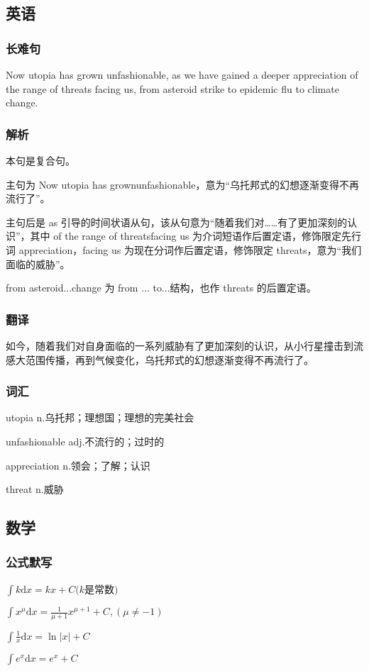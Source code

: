 \documentclass[UTF8]{ctexart}
\begin{document}
\subsection{英语}
\subsubsection{长难句}
Now utopia has grown unfashionable, as we have gained a deeper appreciation of the range of threats facing us, from asteroid strike to epidemic flu to climate change.
\subsubsection{解析}
本句是复合句。

主句为 Now utopia has grownunfashionable，意为“乌托邦式的幻想逐渐变得不再流行了”。

主句后是 as 引导的时间状语从句，该从句意为“随着我们对……有了更加深刻的认识”，其中 of the range of threatsfacing us 为介词短语作后置定语，修饰限定先行词 appreciation，facing us 为现在分词作后置定语，修饰限定 threats，意为“我们面临的威胁”。

from asteroid...change 为 from ... to...结构，也作 threats 的后置定语。
\subsubsection{翻译}
如今，随着我们对自身面临的一系列威胁有了更加深刻的认识，从小行星撞击到流感大范围传播，再到气候变化，乌托邦式的幻想逐渐变得不再流行了。
\subsubsection{词汇}
utopia n.乌托邦；理想国；理想的完美社会

unfashionable adj.不流行的；过时的

appreciation n.领会；了解；认识

threat n.威胁
\subsection{数学}
\subsubsection{公式默写}
\begin{multicols}{2}
      $\int k\mathrm{d}x=kx+C(k$是常数$)$

      $\int x^\mu \mathrm{d}x=\frac{1}{\mu+1}x^{\mu+1}+C,(\mu\ne-1)$

      $\int\frac{1}{x}\mathrm{d}x=\ln\left | x \right | +C$

      $\int e^x\mathrm{d}x=e^x+C$
\end{multicols}
\end{document}
